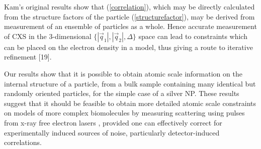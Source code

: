 \documentclass [11pt,fleqn]{article}
\begin{document}
Kam's original results \cite{Kam:1977wc} show that (\ref{correlation}), which may be directly calculated from the structure factors of the particle (\ref{structurefactor}), may be derived from measurement of an ensemble of particles as a whole. Hence accurate measurement of CXS in the 3-dimensional $\{|\vec{q}_1|,|\vec{q}_2|,\Delta\}$ space can lead to constraints which can be placed on the electron density in a model, thus giving a route to iterative refinement [19]. 

Our results show that it is possible to obtain atomic scale information on the internal structure of a particle, from a bulk sample containing many identical  but randomly oriented particles, for the simple case of a silver NP. These results suggest that it should be feasible to obtain more detailed atomic scale constraints on models of more complex biomolecules by measuring scattering using pulses from x-ray free electron lasers \cite{Neutze:2000ih, Spence:2012eo}, provided one can effectively correct for experimentally induced sources of noise, particularly detector-induced correlations.
\end{document}
